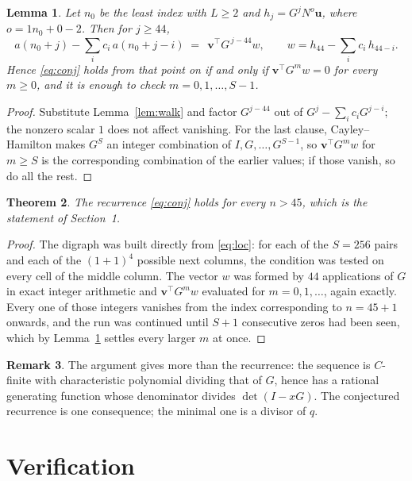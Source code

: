 \documentclass[11pt,a4paper]{article}
\theoremstyle{plain}
\newtheorem{theorem}{Theorem}
\newtheorem{lemma}[theorem]{Lemma}
\theoremstyle{definition}
\newtheorem{remark}[theorem]{Remark}
\begin{document}
\begin{lemma}\label{lem:crit}
Let $n_0$ be the least index with $L\ge2$ and $h_j=G^{j}N^{o}\mathbf{u}$, where
$o=1n_0+0-2$. Then for $j\ge44$,
\[
a(n_0+j)-\sum_i c_i\,a(n_0+j-i)\;=\;\,\mathbf{v}^{\!\top}G^{\,j-44}w,
\qquad w=h_{44}-\sum_i c_i\,h_{44-i} .
\]
Hence \eqref{eq:conj} holds from that point on if and only if
$\mathbf{v}^{\!\top}G^{m}w=0$ for every $m\ge0$, and it is enough to check
$m=0,1,\dots,S-1$.
\end{lemma}

\begin{proof}
Substitute Lemma~\ref{lem:walk} and factor $G^{j-44}$ out of
$G^{j}-\sum_ic_iG^{j-i}$; the nonzero scalar $1$ does not affect
vanishing. For the last clause, Cayley--Hamilton makes $G^{S}$ an integer combination of
$I,G,\dots,G^{S-1}$, so $\mathbf{v}^{\!\top}G^{m}w$ for $m\ge S$ is the corresponding
combination of the earlier values; if those vanish, so do all the rest.
\end{proof}

\begin{theorem}
The recurrence \eqref{eq:conj} holds for every $n>45$, which is the statement of
Section~1.
\end{theorem}

\begin{proof}
The digraph was built directly from \eqref{eq:loc}: for each of the $S=256$ pairs and each
of the $(1+1)^{4}$ possible next columns, the condition was tested on every cell of
the middle column. The vector $w$ was formed by $44$ applications of $G$ in exact integer
arithmetic and $\mathbf{v}^{\!\top}G^{m}w$ evaluated for $m=0,1,\dots$, again exactly.
Every one of those integers vanishes from the index corresponding to $n=45+1$ onwards,
and the run was continued until $S+1$ consecutive zeros had been seen, which by
Lemma~\ref{lem:crit} settles every larger $m$ at once.
\end{proof}

\begin{remark}
The argument gives more than the recurrence: the sequence is $C$-finite with characteristic
polynomial dividing that of $G$, hence has a rational generating function whose denominator
divides $\det(I-xG)$. The conjectured recurrence is one consequence; the minimal one is a
divisor of $q$.
\end{remark}

\section{Verification}
\end{document}
